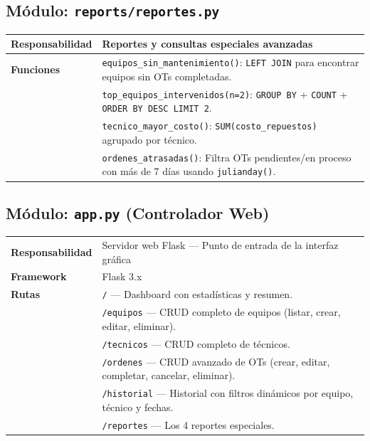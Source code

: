 \documentclass[12pt, a4paper]{article}
\begin{document}
\subsection{Módulo: \texttt{reports/reportes.py}}

\begin{table}[H]
    \centering
    \begin{tabularx}{\textwidth}{l X}
        \toprule
        \textbf{Responsabilidad} & Reportes y consultas especiales avanzadas \\
        \midrule
        \textbf{Funciones} & \texttt{equipos\_sin\_mantenimiento()}: \texttt{LEFT JOIN} para encontrar equipos sin OTs completadas. \\
        & \texttt{top\_equipos\_intervenidos(n=2)}: \texttt{GROUP BY} + \texttt{COUNT} + \texttt{ORDER BY DESC LIMIT 2}. \\
        & \texttt{tecnico\_mayor\_costo()}: \texttt{SUM(costo\_repuestos)} agrupado por técnico. \\
        & \texttt{ordenes\_atrasadas()}: Filtra OTs pendientes/en proceso con más de 7 días usando \texttt{julianday()}. \\
        \bottomrule
    \end{tabularx}
\end{table}

\subsection{Módulo: \texttt{app.py} (Controlador Web)}

\begin{table}[H]
    \centering
    \begin{tabularx}{\textwidth}{l X}
        \toprule
        \textbf{Responsabilidad} & Servidor web Flask — Punto de entrada de la interfaz gráfica \\
        \textbf{Framework} & Flask 3.x \\
        \midrule
        \textbf{Rutas} & \texttt{/} — Dashboard con estadísticas y resumen. \\
        & \texttt{/equipos} — CRUD completo de equipos (listar, crear, editar, eliminar). \\
        & \texttt{/tecnicos} — CRUD completo de técnicos. \\
        & \texttt{/ordenes} — CRUD avanzado de OTs (crear, editar, completar, cancelar, eliminar). \\
        & \texttt{/historial} — Historial con filtros dinámicos por equipo, técnico y fechas. \\
        & \texttt{/reportes} — Los 4 reportes especiales. \\
        \bottomrule
    \end{tabularx}
\end{table}
\end{document}
